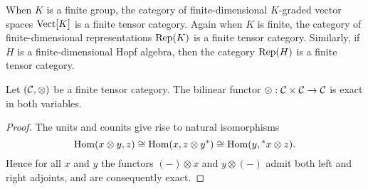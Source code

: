 \documentclass{amsart}
\begin{document}
\begin{example}
When $K$ is a finite group, the category of finite-dimensional $K$-graded vector spaces $\mathrm{Vect}[K]$ is a finite tensor category.  Again when $K$ is finite, the category of finite-dimensional representations $\mathrm{Rep}(K)$ is a finite tensor category.  Similarly, if $H$ is a finite-dimensional Hopf algebra, then the category $\mathrm{Rep}(H)$ is a finite tensor category.%
\end{example}


\begin{lemma} \cite[2.1.8]{MR1797619} \cite[Prop. 1.13.1]{EGNO}  \label{lma:RigidIsExact}
	Let $(\mathcal C, \otimes)$ be a finite tensor category. The bilinear functor $\otimes: \mathcal C \times \mathcal C \to \mathcal C$ is exact in both variables. 
\end{lemma}

\begin{proof}
	The units and counits give rise to natural isomorphisms
 \begin{equation*} 
 	\operatorname{Hom}(x \otimes y, z) \cong \operatorname{Hom}( x, z \otimes y^*) \cong \operatorname{Hom}(y, {}^*x \otimes z).
 \end{equation*}
	Hence for all $x$ and $y$ the functors $(-)\otimes x$ and $y \otimes (-)$ admit both left and right adjoints, and are consequently exact. %
\end{proof} %


\end{document}
